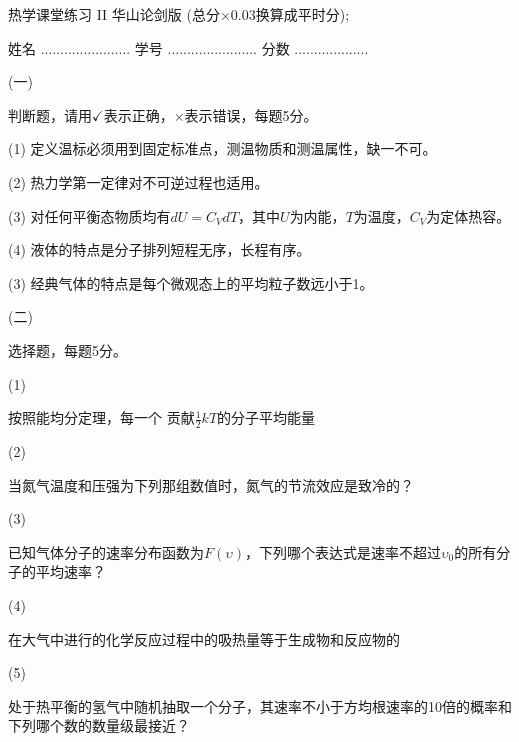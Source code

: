 \documentclass[12pt,CJK]{article}
\begin{document}
\bch
{\large 热学课堂练习 II 华山论剑版 (总分$\times 0.03$换算成平时分);}


姓名 ....................... {\hskip 0.5in}    学号 .......................{\hskip 0.5in}  分数 ...................


\bitem
\item[(一)]{判断题，请用$\checkmark$表示正确，$\times$表示错误，每题5分。

  \bitem
\item[(1)]{定义温标必须用到固定标准点，测温物质和测温属性，缺一不可。\bropt}
\item[(2)]{热力学第一定律对不可逆过程也适用。\bropt}
\item[(3)]{对任何平衡态物质均有$dU = C_VdT$，其中$U$为内能，$T$为温度，$C_V$为定体热容。\bropt}
\item[(4)]{液体的特点是分子排列短程无序，长程有序。\bropt}
\item[(3)]{经典气体的特点是每个微观态上的平均粒子数远小于1。\bropt}  

  \eitem
}

\item[(二)]{选择题，每题5分。

  \bitem

\item[(1)]{按照能均分定理，每一个 \bropt 贡献$\frac{1}{2}kT$的分子平均能量
  

}    
\item[(2)]{当氮气温度和压强为下列那组数值时，氮气的节流效应是致冷的？ \bropt
  

}


\item[(3)]{已知气体分子的速率分布函数为$F(\upsilon)$，下列哪个表达式是速率不超过$\upsilon_0$的所有分子的平均速率？
  \bropt

}
  

  \item[(4)]{
  在大气中进行的化学反应过程中的吸热量等于生成物和反应物的 \bropt


}

\item[(5)]{
  处于热平衡的氢气中随机抽取一个分子，其速率不小于方均根速率的10倍的概率和下列哪个数的数量级最接近？\bropt

}
  \eitem
}
\end{document}
